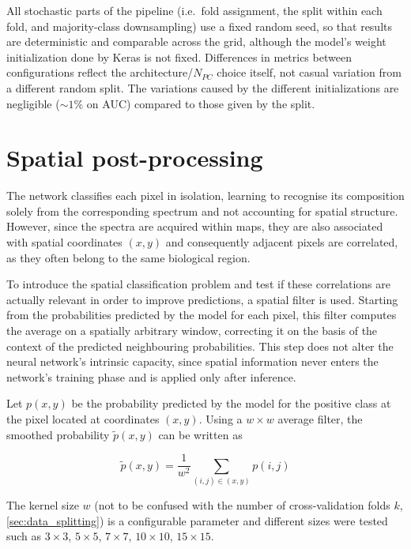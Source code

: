 All stochastic parts of the pipeline (i.e.\ fold assignment, the split within each fold, and majority-class downsampling) use a fixed random seed, so that results are deterministic and comparable across the grid, although the model's weight initialization done by Keras is not fixed. Differences in metrics between configurations reflect the architecture/$N_{PC}$ choice itself, not casual variation from a different random split. The variations caused by the different initializations are negligible ($\sim1\%$ on AUC) compared to those given by the split.



\section{Spatial post-processing}
\label{sec:spatial_post_processing}

The network classifies each pixel in isolation, learning to recognise its composition solely from the corresponding spectrum and not accounting for spatial structure. However, since the spectra are acquired within maps, they are also associated with spatial coordinates \((x,y)\) and consequently adjacent pixels are correlated, as they often belong to the same biological region.

To introduce the spatial classification problem and test if these correlations are actually relevant in order to improve predictions, a spatial filter is used. Starting from the probabilities predicted by the model for each pixel, this filter computes the average on a spatially arbitrary window, correcting it on the basis of the context of the predicted neighbouring probabilities.
This step does not alter the neural network's intrinsic capacity, since spatial information never enters the network's training phase and is applied only after inference.

Let \(p(x,y)\) be the probability predicted by the model for the positive class at the pixel located at coordinates \((x,y)\). Using a \(w \times w\) average filter, the smoothed probability \(\tilde{p}(x,y)\) can be written as

\begin{equation}
    \tilde{p}(x,y) =
    \frac{1}{w^2}
    \sum_{(i,j)\in(x,y)} p(i,j)
    \label{eq:spatial_smoothing}
\end{equation}

The kernel size $w$ (not to be confused with the number of cross-validation folds $k$, \cref{sec:data_splitting}) is a configurable parameter and different sizes were tested such as \(3 \times 3\), \(5 \times 5\), \(7 \times 7\), \(10 \times 10\), \(15 \times 15\).

